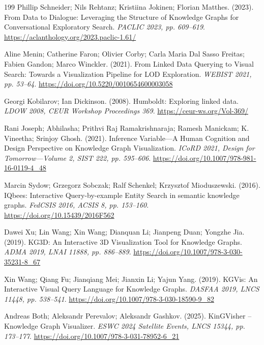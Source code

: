 \documentclass[manuscript,review,screen]{acmart}
\begin{document}
\begin{thebibliography}{199}
 Phillip Schneider; Nils Rehtanz; Kristiina Jokinen; Florian Matthes. (2023). From Data to Dialogue: Leveraging the Structure of Knowledge Graphs for Conversational Exploratory Search. \textit{PACLIC 2023, pp. 609--619}. \url{https://aclanthology.org/2023.paclic-1.61/}

 Aline Menin; Catherine Faron; Olivier Corby; Carla Maria Dal Sasso Freitas; Fabien Gandon; Marco Winckler. (2021). From Linked Data Querying to Visual Search: Towards a Visualization Pipeline for LOD Exploration. \textit{WEBIST 2021, pp. 53--64}. \url{https://doi.org/10.5220/0010654600003058}

 Georgi Kobilarov; Ian Dickinson. (2008). Humboldt: Exploring linked data. \textit{LDOW 2008, CEUR Workshop Proceedings 369}. \url{https://ceur-ws.org/Vol-369/}

 Rani Joseph; Abhilasha; Prithvi Raj Ramakrishnaraja; Ramesh Manickam; K. Vineetha; Srinjoy Ghosh. (2021). Inference Variable---A Human Cognition and Design Perspective on Knowledge Graph Visualization. \textit{ICoRD 2021, Design for Tomorrow---Volume 2, SIST 222, pp. 595--606}. \url{https://doi.org/10.1007/978-981-16-0119-4_48}

 Marcin Sydow; Grzegorz Sobczak; Ralf Schenkel; Krzysztof Mioduszewski. (2016). IQbees: Interactive Query-by-example Entity Search in semantic knowledge graphs. \textit{FedCSIS 2016, ACSIS 8, pp. 153--160}. \url{https://doi.org/10.15439/2016F562}

 Dawei Xu; Lin Wang; Xin Wang; Dianquan Li; Jianpeng Duan; Yongzhe Jia. (2019). KG3D: An Interactive 3D Visualization Tool for Knowledge Graphs. \textit{ADMA 2019, LNAI 11888, pp. 886--889}. \url{https://doi.org/10.1007/978-3-030-35231-8_67}

 Xin Wang; Qiang Fu; Jianqiang Mei; Jianxin Li; Yajun Yang. (2019). KGVis: An Interactive Visual Query Language for Knowledge Graphs. \textit{DASFAA 2019, LNCS 11448, pp. 538--541}. \url{https://doi.org/10.1007/978-3-030-18590-9_82}

 Andreas Both; Aleksandr Perevalov; Aleksandr Gashkov. (2025). KinGVisher -- Knowledge Graph Visualizer. \textit{ESWC 2024 Satellite Events, LNCS 15344, pp. 173--177}. \url{https://doi.org/10.1007/978-3-031-78952-6_21}


\end{thebibliography}
\end{document}
